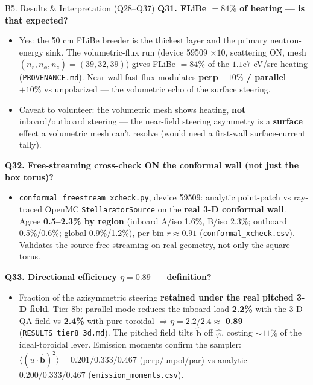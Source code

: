 \documentclass[11pt,aspectratio=169]{beamer}
\newcommand{\bhat}{\hat{\mathbf{b}}}
\newcommand{\qitem}[1]{\medskip\textbf{#1}\par}
\begin{document}
\begin{frame}[allowframebreaks]{B5. Results \& Interpretation (Q28--Q37)}
\qitem{Q31. FLiBe $= 84\%$ of heating --- is that expected?}
\begin{itemize}
\item Yes: the 50 cm FLiBe breeder is the thickest layer and the primary neutron-energy sink.
      The volumetric-flux run (device 59509 $\times 10$, scattering ON, mesh
      $(n_r, n_\phi, n_z) = (39, 32, 39)$) gives FLiBe $= 84\%$ of the $1.1\mathrm{e}7$ eV/src
      heating (\texttt{PROVENANCE.md}). Near-wall fast flux modulates \textbf{perp $-10\%$ /
      parallel $+10\%$} vs unpolarized --- the volumetric echo of the surface steering.
\item Caveat to volunteer: the volumetric mesh shows heating, \textbf{not} inboard/outboard
      steering --- the near-field steering asymmetry is a \textbf{surface} effect a volumetric
      mesh can't resolve (would need a first-wall surface-current tally).
\end{itemize}

\qitem{Q32. Free-streaming cross-check ON the conformal wall (not just the box torus)?}
\begin{itemize}
\item \texttt{conformal\_freestream\_xcheck.py}, device 59509: analytic point-patch vs
      ray-traced OpenMC \texttt{StellaratorSource} on the \textbf{real 3-D conformal wall}.
      Agree \textbf{0.5--2.3\% by region} (inboard A/iso 1.6\%, B/iso 2.3\%; outboard
      0.5\%/0.6\%; global 0.9\%/1.2\%), per-bin $r \approx 0.91$
      (\texttt{conformal\_xcheck.csv}). Validates the source free-streaming on real geometry,
      not only the square torus.
\end{itemize}

\framebreak
\qitem{Q33. Directional efficiency $\eta = 0.89$ --- definition?}
\begin{itemize}
\item Fraction of the axisymmetric steering \textbf{retained under the real pitched 3-D field}.
      Tier 8b: parallel mode reduces the inboard load \textbf{2.2\%} with the 3-D QA field vs
      \textbf{2.4\%} with pure toroidal $\Rightarrow \eta = 2.2/2.4 \approx$ \textbf{0.89}
      (\texttt{RESULTS\_tier8\_3d.md}). The pitched field tilts $\bhat$ off $\hat\varphi$,
      costing $\sim 11\%$ of the ideal-toroidal lever. Emission moments confirm the sampler:
      $\langle(u \cdot \bhat)^2\rangle = 0.201/0.333/0.467$ (perp/unpol/par) vs analytic
      $0.200/0.333/0.467$ (\texttt{emission\_moments.csv}).
\end{itemize}


\end{frame}
\end{document}
